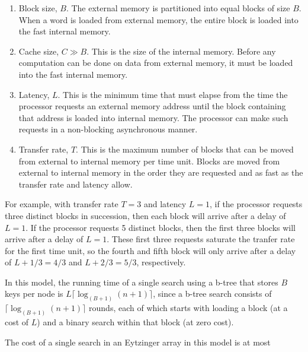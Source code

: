 \documentclass{patmorin}
\begin{document}
\begin{enumerate}

  \item Block size, $B$. The external memory is partitioned into equal
    blocks of size $B$. When a word is loaded from external memory,
    the entire block is loaded into the fast internal memory.

  \item Cache size, $C \gg B$.  This is the size of the internal
    memory. Before any computation can be done on data from external
    memory, it must be loaded into the fast internal memory.

  \item Latency, $L$. This is the minimum time that must elapse from the
    time the processor requests an external memory address until the block
    containing that address is loaded into internal memory.  The processor
    can make such requests in a non-blocking asynchronous manner.

  \item Transfer rate, $T$.  This is the maximum number of blocks that
    can be moved from external to internal memory per time unit.
    Blocks are moved from external to internal memory in the order they
    are requested and as fast as the transfer rate and latency allow.

\end{enumerate}

For example, with transfer rate $T=3$ and latency $L=1$, if the processor
requests three distinct blocks in succession, then each block will arrive
after a delay of $L=1$.  If the processor requests 5 distinct blocks,
then the first three blocks will arrive after a delay of $L=1$. These
first three requests saturate the tranfer rate for the first time unit, so
the fourth and fifth block will only arrive after a delay of $L+1/3=4/3$
and $L+2/3=5/3$, respectively.

In this model, the running time of a single search using a b-tree that
stores $B$ keys per node is $L\lceil\log_(B+1)(n+1)\rceil$, since a
b-tree search consists of $\lceil\log_(B+1)(n+1)\rceil$ rounds, each of
which starts with loading a block (at a cost of $L$) and a binary search
within that block (at zero cost).

The cost of a single search in an Eytzinger array in this model is at most
\end{document}
